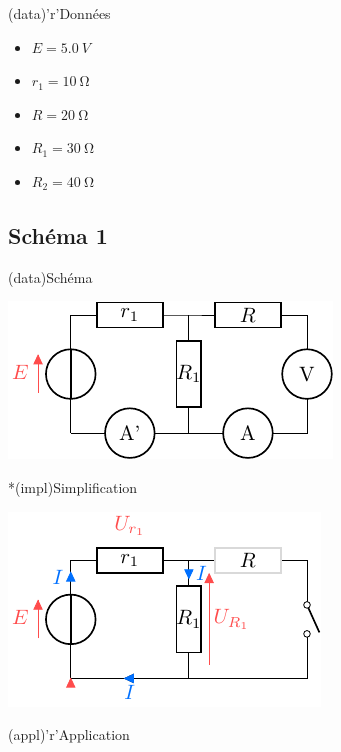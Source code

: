 \documentclass[../../main/main.tex]{subfiles}
\begin{document}
{\begin{tcbraster}[raster columns=2, raster equal height=rows]
\begin{tcb}
\begin{center}
        \end{center}
    \end{tcb}
    \begin{tcb}[sidebyside](data)'r'{Données}
        \begin{itemize}
            \item $E   = \SI{5.0}{V}$
            \item $r_1 = \SI{10}{\ohm}$
            \item $R   = \SI{20}{\ohm}$
        \end{itemize}
        \tcblower
        \begin{itemize}
            \item $R_1 = \SI{30}{\ohm}$
            \item $R_2 = \SI{40}{\ohm}$
        \end{itemize}
    \end{tcb}
\end{tcbraster}
\subsection{Schéma 1}
\begin{tcbraster}[raster columns=3, raster equal height=rows]
    \begin{tcb}(data){Schéma}
        \begin{center}
            \hspace*{-12pt}
            \includegraphics{mes_iu_a}
        \end{center}
    \end{tcb}
    \begin{tcb}*(impl){Simplification}
        \begin{center}
            \hspace*{-12pt}
            \includegraphics{mes_iu_a-simple}
        \end{center}
    \end{tcb}
    \begin{tcb}(appl)'r'{Application}


\end{tcb}
\end{tcbraster}}
\end{document}
